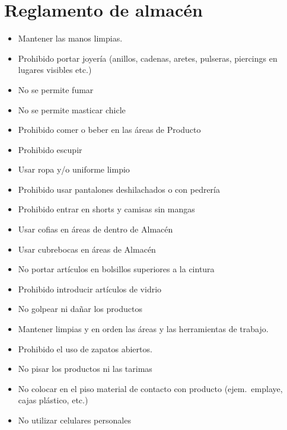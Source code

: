 \thispagestyle{formato-PI}
\renewcommand{\MayorVer}{2}
\renewcommand{\MenorVer}{1}
\renewcommand{\Codigo}{BPD-5-CI/CE}
\renewcommand{\FechaPub}{2023--01}
\renewcommand{\Titulo}{Reglamento de almacén}
\section{\Titulo}

\begin{itemize}
	\item Mantener las manos limpias.
	\item Prohibido portar joyería (anillos, cadenas, aretes, pulseras, piercings en lugares visibles etc.)
	\item No se permite fumar
	\item No se permite masticar chicle
	\item Prohibido comer o beber en las áreas de Producto
	\item Prohibido escupir
	\item Usar ropa y/o uniforme limpio
	\item Prohibido usar pantalones deshilachados o con pedrería
	\item Prohibido entrar en shorts y camisas sin mangas
	\item Usar cofias en áreas de dentro de Almacén
	\item Usar cubrebocas en áreas de Almacén
	\item No portar artículos en bolsillos superiores a la cintura
	\item Prohibido introducir artículos de vidrio
	\item No golpear ni dañar los productos
	\item Mantener limpias y en orden las áreas y las herramientas de trabajo.
	\item Prohibido el uso de zapatos abiertos.
	\item No pisar los productos ni las tarimas
	\item No colocar en el piso material de contacto con producto (ejem.\ emplaye, cajas plástico, etc.)
	\item No utilizar celulares personales
\end{itemize}

